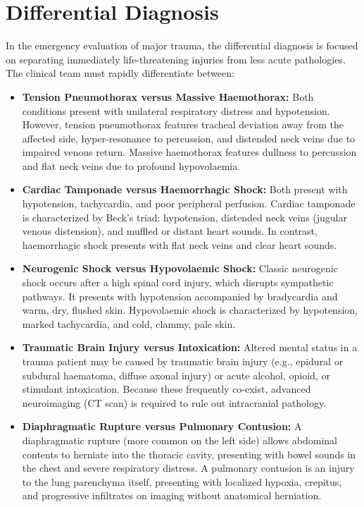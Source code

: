 \section*{Differential Diagnosis}
In the emergency evaluation of major trauma, the differential diagnosis is focused on separating immediately life-threatening injuries from less acute pathologies. The clinical team must rapidly differentiate between:
\begin{itemize}
    \item \textbf{Tension Pneumothorax versus Massive Haemothorax:} Both conditions present with unilateral respiratory distress and hypotension. However, tension pneumothorax features tracheal deviation away from the affected side, hyper-resonance to percussion, and distended neck veins due to impaired venous return. Massive haemothorax features dullness to percussion and flat neck veins due to profound hypovolaemia.
    \item \textbf{Cardiac Tamponade versus Haemorrhagic Shock:} Both present with hypotension, tachycardia, and poor peripheral perfusion. Cardiac tamponade is characterized by Beck's triad: hypotension, distended neck veins (jugular venous distension), and muffled or distant heart sounds. In contrast, haemorrhagic shock presents with flat neck veins and clear heart sounds.
    \item \textbf{Neurogenic Shock versus Hypovolaemic Shock:} Classic neurogenic shock occurs after a high spinal cord injury, which disrupts sympathetic pathways. It presents with hypotension accompanied by bradycardia and warm, dry, flushed skin. Hypovolaemic shock is characterized by hypotension, marked tachycardia, and cold, clammy, pale skin.
    \item \textbf{Traumatic Brain Injury versus Intoxication:} Altered mental status in a trauma patient may be caused by traumatic brain injury (e.g., epidural or subdural haematoma, diffuse axonal injury) or acute alcohol, opioid, or stimulant intoxication. Because these frequently co-exist, advanced neuroimaging (CT scan) is required to rule out intracranial pathology.
    \item \textbf{Diaphragmatic Rupture versus Pulmonary Contusion:} A diaphragmatic rupture (more common on the left side) allows abdominal contents to herniate into the thoracic cavity, presenting with bowel sounds in the chest and severe respiratory distress. A pulmonary contusion is an injury to the lung parenchyma itself, presenting with localized hypoxia, crepitus, and progressive infiltrates on imaging without anatomical herniation.
\end{itemize}

